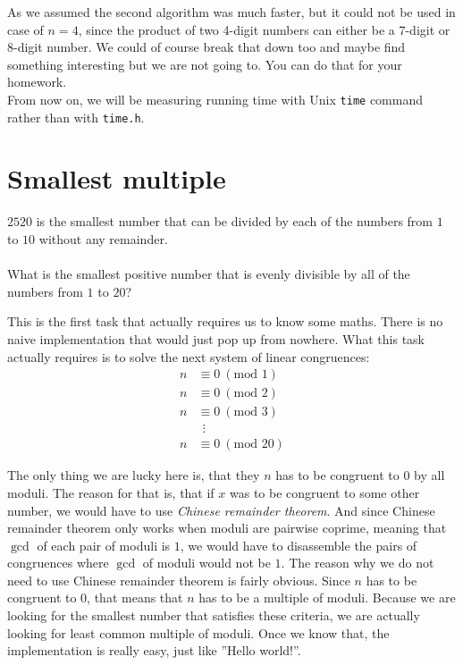 \documentclass{book}
\renewcommand{\mod}{\textrm{mod }}
\newenvironment{task}
  {\begin{mdframed}[backgroundcolor=lightgray]}
  {\end{mdframed}}
\begin{document}
As we assumed the second algorithm was much faster, but it could not be used in case of $n = 4$, since the product of two 4-digit numbers can either be a 7-digit or 8-digit number. We could of course break that down too and maybe find something interesting but we are not going to. You can do that for your homework.\\

From now on, we will be measuring running time with Unix \texttt{time} command rather than with \texttt{time.h}.



\section{Smallest multiple}

\begin{task}
$2520$ is the smallest number that can be divided by each of the numbers from $1$ to $10$ without any remainder.\\
\\
What is the smallest positive number that is evenly divisible by all of the numbers from $1$ to $20$?
\end{task}

This is the first task that actually requires us to know some maths. There is no naive implementation that would just pop up from nowhere. What this task actually requires is to solve the next system of linear congruences:
\begin{align*}
n &\equiv 0~(\mod 1)\\
n &\equiv 0~(\mod 2)\\
n &\equiv 0~(\mod 3)\\
&~~\vdots\\
n &\equiv 0~(\mod 20)
\end{align*}

The only thing we are lucky here is, that they $n$ has to be congruent to $0$ by all moduli. The reason for that is, that if $x$ was to be congruent to some other number, we would have to use \textit{Chinese remainder theorem}. And since Chinese remainder theorem only works when moduli are pairwise coprime, meaning that $\gcd$ of each pair of moduli is $1$, we would have to disassemble the pairs of congruences where $\gcd$ of moduli would not be $1$. The reason why we do not need to use Chinese remainder theorem is fairly obvious. Since $n$ has to be congruent to $0$, that means that $n$ has to be a multiple of moduli. Because we are looking for the smallest number that satisfies these criteria, we are actually looking for least common multiple of moduli. Once we know that, the implementation is really easy, just like ''Hello world!''.\\
\end{document}
